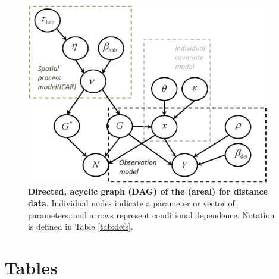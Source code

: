 \documentclass[10pt]{article}
\begin{document}

\begin{figure}
\begin{center}
\includegraphics[width=0.95\textwidth]{DAG.eps}
\end{center}
\caption{{\bf Directed, acyclic graph (DAG) of the (areal) %
for distance data}. Individual nodes indicate a parameter or vector of parameters, and arrows represent conditional dependence. Notation is defined in Table \ref{tab:defs}.}
\label{fig:DAG}
\end{figure}
\clearpage


\section*{Tables}
\end{document}

